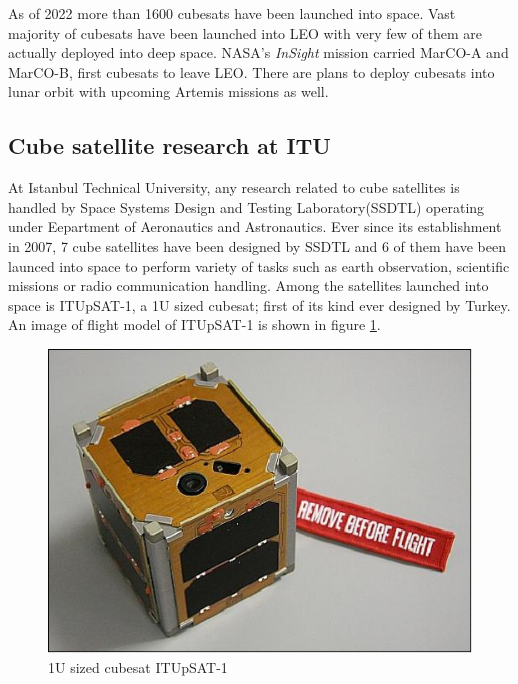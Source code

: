 As of 2022 more than 1600 cubesats have been launched into space\cite{Nanosats61online}. Vast majority of cubesats have been launched into LEO with very few of them are actually deployed into deep space. NASA's \textit{InSight} mission carried  MarCO-A and MarCO-B, first cubesats to leave LEO\cite{klesh2018marco}. There are plans to deploy cubesats into lunar orbit with upcoming Artemis missions as well\cite{tsay2015lunarcube}.
\subsection{Cube satellite research at ITU}
At Istanbul Technical University, any research related to cube satellites is handled by Space Systems Design and Testing Laboratory(SSDTL) operating under Eepartment of Aeronautics and Astronautics. Ever since its establishment in 2007, 7 cube satellites have been designed by SSDTL and 6 of them have been launced into space to perform variety of tasks such as earth observation, scientific missions or radio communication handling\cite{aslan2015integration}. Among the satellites launched into space is ITUpSAT-1, a 1U sized cubesat; first of its kind ever designed by Turkey\cite{aslanspace}. An image of flight model of ITUpSAT-1 is shown in figure \ref{fig:pSAT}.

\begin{figure}[ht]
    \centering
    \includegraphics[scale=.9]{fig/ITUpSAT.png}
    \caption[1U sized cubesat ITUpSAT-1]{1U sized cubesat ITUpSAT-1\cite{aslanspace}}
    \label{fig:pSAT}
\end{figure}

